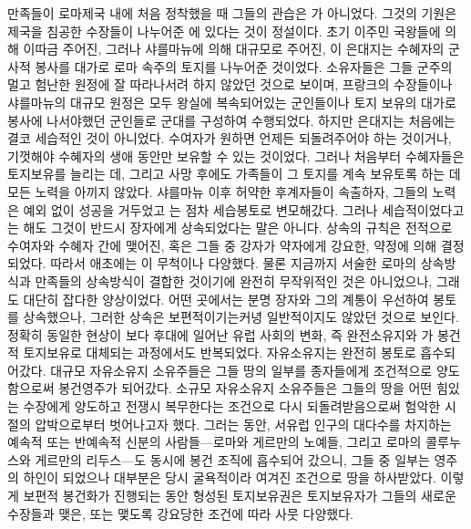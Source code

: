 만족들이 로마제국 내에 처음 정착했을 때
그들의 관습은 가 아니었다.
그것의 기원은 제국을 침공한 수장들이 나누어준
에 있다는 것이 정설이다.
초기 이주민 국왕들에 의해 이따금 주어진,
그러나 샤를마뉴에 의해 대규모로 주어진,
이 은대지는 수혜자의 군사적 봉사를 대가로
로마 속주의 토지를 나누어준 것이었다.
 소유자들은 그들 군주의 멀고 험난한 원정에
잘 따라나서려 하지 않았던 것으로 보이며,
프랑크의 수장들이나 샤를마뉴의 대규모 원정은
모두
왕실에 복속되어있는 군인들이나
토지 보유의 대가로 봉사에 나서야했던 군인들로
군대를 구성하여 수행되었다.
하지만 은대지는 처음에는 결코 세습적인 것이 아니었다.
수여자가 원하면 언제든 되돌려주어야 하는 것이거나,
기껏해야 수혜자의 생애 동안만 보유할 수 있는 것이었다.
그러나 처음부터 수혜자들은 토지보유를 늘리는 데, 그리고
사망 후에도 가족들이 그 토지를 계속 보유토록 하는 데
모든 노력을 아끼지 않았다.
샤를마뉴 이후 허약한 후계자들이 속출하자,
그들의 노력은 예외 없이 성공을 거두었고
는 점차 세습봉토로 변모해갔다.
그러나 세습적이었다고는 해도 그것이 반드시
장자에게 상속되었다는 말은 아니다.
상속의 규칙은 전적으로 수여자와 수혜자 간에 맺어진,
혹은 그들 중 강자가 약자에게 강요한,
약정에 의해 결정되었다.
따라서 애초에는 이 무척이나 다양했다.
물론 지금까지 서술한 로마의 상속방식과 만족들의 상속방식이
결합한 것이기에 완전히 무작위적인 것은 아니었으나,
그래도 대단히 잡다한 양상이었다.
어떤 곳에서는 분명 장자와 그의 계통이 우선하여 봉토를 상속했으나,
그러한 상속은 보편적이기는커녕 일반적이지도 않았던 것으로 보인다.
정확히 동일한 현상이
보다 후대에 일어난 유럽 사회의 변화,
즉  완전소유지와
 가
봉건적 토지보유로 대체되는 과정에서도
반복되었다.
자유소유지는 완전히 봉토로 흡수되어갔다.
대규모 자유소유지 소유주들은
그들 땅의 일부를 종자들에게 조건적으로 양도함으로써
봉건영주가 되어갔다.
소규모 자유소유지 소유주들은
그들의 땅을 어떤 힘있는 수장에게 양도하고
전쟁시 복무한다는 조건으로 다시 되돌려받음으로써
험악한 시절의 압박으로부터 벗어나고자 했다.
그러는 동안,
서유럽 인구의 대다수를 차지하는
예속적 또는 반예속적 신분의 사람들---로마와 게르만의 노예들,
그리고 로마의 콜루누스와 게르만의 리두스---도
동시에
봉건 조직에 흡수되어 갔으니,
그들 중 일부는 영주의 하인이 되었으나
대부분은 당시 굴욕적이라 여겨진 조건으로 땅을 하사받았다.
이렇게 보편적 봉건화가 진행되는 동안 형성된 토지보유권은
토지보유자가 그들의 새로운 수장들과 맺은, 또는
맻도록 강요당한 조건에 따라 사뭇 다양했다.
